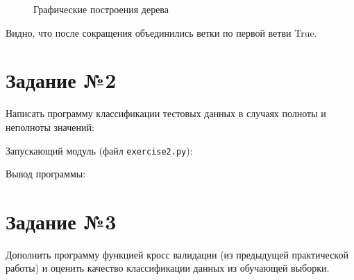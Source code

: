 \documentclass{article} %
\begin{document}
\begin{figure}[H]
	\centering
	\hfill
    \caption{Графические построения дерева}
\end{figure}

Видно, что после сокращения объединились ветки по первой ветви True.

\clearpage
\section{Задание №2}
Написать программу классификации тестовых данных в случаях полноты и
неполноты значений:
\bigskip

Запускающий модуль (файл \verb$exercise2.py$):
\bigskip

Вывод программы:


\clearpage
\section{Задание №3}
Дополнить программу функцией кросс валидации (из предыдущей практической
работы) и оценить качество классификации данных из обучающей выборки.
\bigskip
\end{document}
